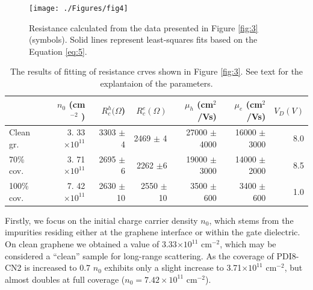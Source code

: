 \documentclass[preprint,aip,jap]{revtex4-2}
\begin{document}
\begin{figure}[htb]
  \centering
   \texttt{[image: ./Figures/fig4]}  
  \caption{Resistance calculated from the data presented in Figure {\ref{fig:3}} (symbols).
 Solid lines represent least-squares fits based on the Equation \ref{eq:5}.
}
  \label{fig:4}
\end{figure}

\noindent \begin{table}[h]
  \centering
  \begin{tabular}{|l|r|r|r|r|r|r|} \hline%
   & $n_{0}$ (cm$^{-2}$ )& $R_{c}^{h}(\Omega$) & $R_{c}^{e}(\Omega)$ & $\mu_{h}$ (cm$^{2}$/Vs) & $\mu_{e}$ (cm$^{2}$/Vs) & $V_{D}(V) $  \\ \hline%
    Clean gr.
 & 3.
33$\times 10^{11}$ & 3303 $\pm$ 4 & 2469 $\pm$ 4 & 27000 $\pm$ 4000 & 16000 $\pm$ 3000 & 8.0 \\
    70\% cov.
 &3.
71$\times 10^{11}$ & 2695 $\pm$ 6 & 2262 $\pm$6 & 19000 $\pm$ 3000 & 14000 $\pm $2000 & 8.5 \\
     100\% cov.
 &7.
42$\times 10^{11}$ & 2630 $\pm$ 10 & 2550 $\pm$10 & 3500 $\pm$ 600 & 3400 $\pm$ 600 & 1.0 \\ \hline
    
  \end{tabular}
  \caption{The results of fitting of resistance crves shown in Figure \ref{fig:3}.
 See  text for the explantaion of the parameters.
}
  \label{tab:1}
\end{table}


Firstly, we focus on the initial charge carrier density $n_0$, which stems from the impurities residing either at the graphene interface or within the gate dielectric.
 On clean graphene we obtained a value of 3.33$\times 10^{11}$ cm$^{-2}$, which may be considered a ``clean'' sample for long-range scattering.
  As the coverage of PDI8-CN2 is increased to 0.7 $n_0$ exhibits only a slight increase to 3.71$\times 10^{11}$ cm$^{-2}$, but almost doubles at full coverage ($n_{0}=7.42\times 10^{11}$ cm$^{-2}$).
\end{document}
